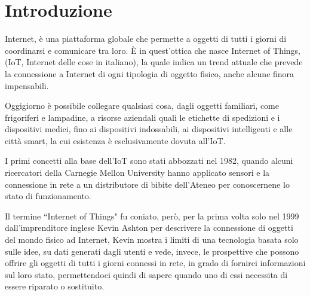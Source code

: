 \chapter{Introduzione}
\label{ch:introduzione}
Internet, è una piattaforma globale che permette a oggetti di tutti i giorni di coordinarsi e comunicare tra loro. È in quest'ottica che nasce 
Internet of Things, (IoT, Internet delle cose in italiano), la quale indica un trend attuale che prevede la connessione a Internet di ogni tipologia di oggetto fisico, 
anche alcune finora impensabili.

Oggigiorno è possibile collegare qualsiasi cosa, dagli oggetti familiari, come frigoriferi e lampadine, a risorse aziendali quali 
le etichette di spedizioni e i dispositivi medici, fino ai dispositivi indossabili, ai dispositivi intelligenti e alle città smart, la cui esistenza è esclusivamente 
dovuta all'IoT.

I primi concetti alla base dell’IoT sono stati abbozzati nel 1982, quando alcuni ricercatori della Carnegie Mellon University hanno applicato sensori
e la connessione in rete a un distributore di bibite dell’Ateneo per conoscernene lo stato di funzionamento. 

Il termine ``Internet of Things" fu coniato, però, per la prima volta solo nel 1999 dall'imprenditore inglese Kevin Ashton per descrivere la connessione di oggetti del 
mondo fisico ad Internet, Kevin mostra i limiti di una tecnologia basata solo sulle idee, su dati generati dagli utenti e vede, invece, le prospettive che possono 
offrire gli oggetti di tutti i giorni connessi in rete, in grado di fornirci informazioni sul loro stato, permettendoci quindi di sapere quando uno di essi necessita 
di essere riparato o sostituito.

